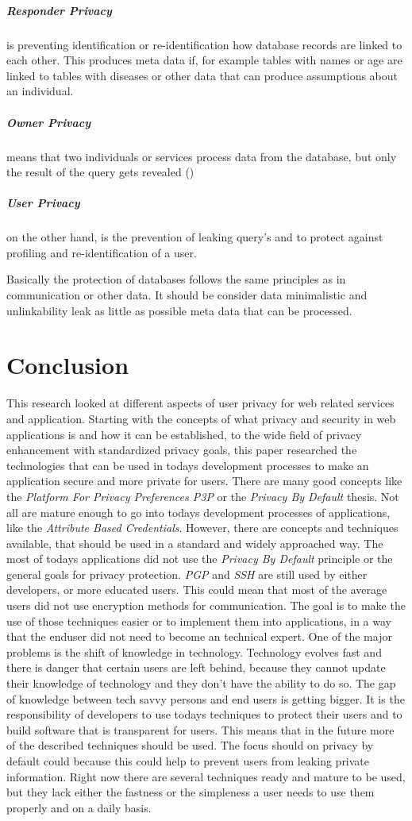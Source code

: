 \subparagraph{Responder Privacy} is preventing identification or re-identification how database records are linked to each other. This produces meta data if, for example tables with names or age are linked to tables with diseases or other data that can produce assumptions about an individual.

\subparagraph{Owner Privacy} means that two individuals or services process data from the database, but only the result of the query gets revealed (\cite{danezis2015privacy})

\subparagraph{User Privacy} on the other hand, is the prevention of leaking query's and to protect against profiling and re-identification of a user.

Basically the protection of databases follows the same principles as in communication or other data. It should be consider data minimalistic and unlinkability leak as little as possible meta data that can be processed.

\section{Conclusion}
This research looked at different aspects of user privacy for web related services and application. Starting with the concepts of what privacy and security in web applications is and how it can be established, to the wide field of privacy enhancement with standardized privacy goals, this paper researched the technologies that can be used in todays development processes to make an application secure and more private for users. There are many good concepts like the \textit{Platform For Privacy Preferences P3P} or the \textit{Privacy By Default} thesis. Not all are mature enough to go into todays development processes of applications, like the \textit{Attribute Based Credentials}. However, there are concepts and techniques available, that should be used in a standard and widely approached way. The most of todays applications did not use the \textit{Privacy By Default} principle or the general goals for privacy protection. \textit{PGP} and \textit{SSH} are still used by either developers, or more educated users. This could mean that most of the average users did not use encryption methods for communication. The goal is to  make the use of those techniques easier or to implement them into applications, in a way that the enduser did not need to become an technical expert. One of the major problems is the shift of knowledge in technology. Technology evolves fast and there is danger that certain users are left behind, because they cannot update their knowledge of technology and they don't have the ability to do so. The gap of knowledge between tech savvy persons and end users is getting bigger. It is the responsibility of developers to use todays techniques to protect their users and to build software that is transparent for users. This means that in the future more of the described techniques should be used. The focus should on privacy by default could because this could help to prevent users from leaking private information. Right now there are several techniques ready and mature to be used, but they lack either the fastness or the simpleness a user needs to use them properly and on a daily basis.